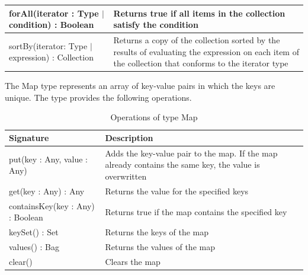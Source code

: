 \begin{longtabu} {|p{6.5cm}|X|}
			forAll(iterator : Type $|$ condition) : Boolean & Returns true if all items in the collection satisfy the condition \\\hline
			
			
			sortBy(iterator: Type $|$ expression) : Collection & Returns a copy of the collection sorted by the results of evaluating the expression on each item of the collection that conforms to the iterator type \\\hline

\end{longtabu}

The Map type represents an array of key-value pairs in which the keys are unique. The type provides the following operations.

\begin{longtabu} {|p{6.5cm}|X|}
			
			\caption{Operations of type Map}
			\label{tab:MapOperations}\\
			
			\hline
			
			\textbf{Signature} & \textbf{Description} \\\hline

			put(key : Any, value : Any) & Adds the key-value pair to the map. If the map already contains the same key, the value is overwritten\\\hline
				
			get(key : Any) : Any & Returns the value for the specified keys\\\hline
	
			containsKey(key : Any) : Boolean & Returns true if the map contains the specified key\\\hline
	
			keySet() : Set & Returns the keys of the map\\\hline
			
			values() : Bag & Returns the values of the map\\\hline
			
			clear() & Clears the map\\\hline
			
\end{longtabu}

